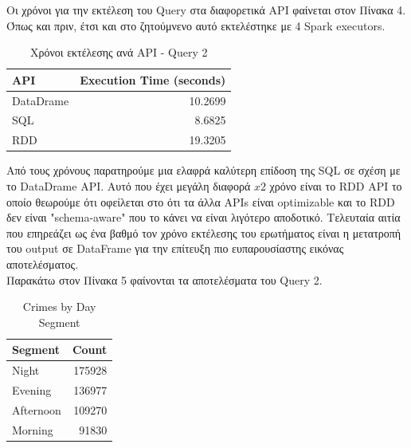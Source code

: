\documentclass{article}
\begin{document}
Οι χρόνοι για την εκτέλεση του  Query στα διαφορετικά API φαίνεται στον Πίνακα 4. Όπως και πριν, έτσι και στο ζητούμνενο αυτό εκτελέστηκε με 4 Spark executors. 

\begin{table}[h]
\centering
\begin{tabular}{|l|r|}
\hline
\textbf{API} & \textbf{Execution Time (seconds)} \\ \hline
DataDrame            & 10.2699                           \\ \hline
SQL           & 8.6825                            \\ \hline
RDD           & 19.3205                          \\ \hline
\end{tabular}
\caption{ Χρόνοι εκτέλεσης ανά API - Query 2}
\label{table:query_execution_times}
\end{table}

Από τους χρόνους παρατηρούμε μια ελαφρά καλύτερη επίδοση της  SQL  σε σχέση με το  DataDrame API. Αυτό που έχει μεγάλη διαφορά \(x2\) χρόνο είναι το  RDD API  το οποίο θεωρούμε ότι οφείλεται στο ότι τα άλλα  APIs  είναι optimizable  και το  RDD  δεν είναι  "schema-aware"  που το κάνει να είναι λιγότερο αποδοτικό. Τελευταία αιτία που επηρεάζει ως ένα βαθμό τον χρόνο εκτέλεσης του ερωτήματος είναι η μετατροπή του  output  σε  DataFrame  για την επίτευξη πιο ευπαρουσίαστης εικόνας αποτελέσματος. \\


Παρακάτω στον Πίνακα 5 φαίνονται τα αποτελέσματα του   Query 2. 

\begin{table}[h]
\centering
\begin{tabular}{|l|r|}
\hline
Segment   & Count  \\ \hline
Night     & 175928 \\ \hline
Evening   & 136977 \\ \hline
Afternoon & 109270 \\ \hline
Morning   & 91830  \\ \hline
\end{tabular}
\caption{Crimes by Day Segment}
\label{table:segment_count}
\end{table}
\end{document}
